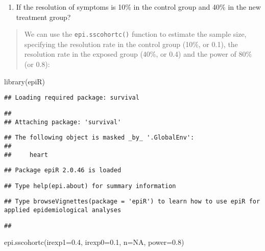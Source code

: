\documentclass[
]{memoir}
\newenvironment{Shaded}{\begin{snugshade}}{\end{snugshade}}
\newcommand{\AttributeTok}[1]{\textcolor[rgb]{0.77,0.63,0.00}{#1}}
\newcommand{\ConstantTok}[1]{\textcolor[rgb]{0.00,0.00,0.00}{#1}}
\newcommand{\FloatTok}[1]{\textcolor[rgb]{0.00,0.00,0.81}{#1}}
\newcommand{\FunctionTok}[1]{\textcolor[rgb]{0.00,0.00,0.00}{#1}}
\newcommand{\NormalTok}[1]{#1}
\providecommand{\tightlist}{%
  \setlength{\itemsep}{0pt}\setlength{\parskip}{0pt}}
\begin{document}
\begin{enumerate}
\def\labelenumi{\alph{enumi})}
\tightlist
\item
  If the resolution of symptoms is 10\% in the control group and 40\% in the new treatment group?
\end{enumerate}

\begin{quote}
We can use the \texttt{epi.sscohortc()} function to estimate the sample size, specifying the resolution rate in the control group (10\%, or 0.1), the resolution rate in the exposed group (40\%, or 0.4) and the power of 80\% (or 0.8):
\end{quote}

\begin{Shaded}
\begin{Highlighting}[]
\FunctionTok{library}\NormalTok{(epiR)}
\end{Highlighting}
\end{Shaded}

\begin{verbatim}
## Loading required package: survival
\end{verbatim}

\begin{verbatim}
## 
## Attaching package: 'survival'
\end{verbatim}

\begin{verbatim}
## The following object is masked _by_ '.GlobalEnv':
## 
##     heart
\end{verbatim}

\begin{verbatim}
## Package epiR 2.0.46 is loaded
\end{verbatim}

\begin{verbatim}
## Type help(epi.about) for summary information
\end{verbatim}

\begin{verbatim}
## Type browseVignettes(package = 'epiR') to learn how to use epiR for applied epidemiological analyses
\end{verbatim}

\begin{verbatim}
## 
\end{verbatim}

\begin{Shaded}
\begin{Highlighting}[]
\FunctionTok{epi.sscohortc}\NormalTok{(}\AttributeTok{irexp1=}\FloatTok{0.4}\NormalTok{, }\AttributeTok{irexp0=}\FloatTok{0.1}\NormalTok{, }\AttributeTok{n=}\ConstantTok{NA}\NormalTok{, }\AttributeTok{power=}\FloatTok{0.8}\NormalTok{)}
\end{Highlighting}
\end{Shaded}
\end{document}
